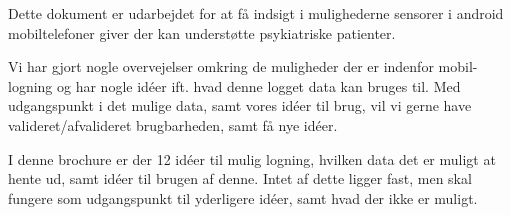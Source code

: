 Dette dokument er udarbejdet for at få indsigt i mulighederne sensorer i android mobiltelefoner giver der kan understøtte psykiatriske patienter.

Vi har gjort nogle overvejelser omkring de muligheder der er indenfor mobil-logning og har nogle idéer ift. hvad denne logget data kan bruges til.
Med udgangspunkt i det mulige data, samt vores idéer til brug, vil vi gerne have valideret/afvalideret brugbarheden, samt få nye idéer.

I denne brochure er der 12 idéer til mulig logning, hvilken data det er muligt at hente ud, samt idéer til brugen af denne.
Intet af dette ligger fast, men skal fungere som udgangspunkt til yderligere idéer, samt hvad der ikke er muligt.
